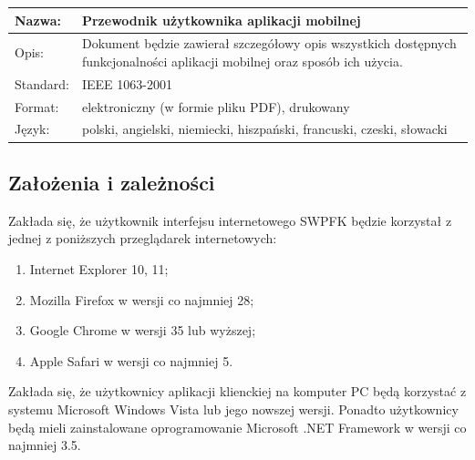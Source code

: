\begin{center}
\begin{tabular}[h]{|p{2cm}|p{13.1cm}|}
\hline
Nazwa: & Przewodnik użytkownika aplikacji mobilnej \\ \hline
Opis: & Dokument będzie zawierał szczegółowy opis wszystkich dostępnych  funkcjonalności aplikacji mobilnej oraz sposób ich użycia.  \\ \hline
Standard: & IEEE 1063-2001 \\ \hline
Format: & elektroniczny (w formie pliku PDF), drukowany \\ \hline
Język: & polski, angielski, niemiecki, hiszpański, francuski, czeski, słowacki \\
\hline
\end{tabular}
\end{center}

\subsection{Założenia i zależności}
Zakłada się, że użytkownik interfejsu internetowego SWPFK będzie korzystał z jednej z poniższych przeglądarek internetowych:
\begin{enumerate}
\item Internet Explorer 10, 11;
\item Mozilla Firefox w wersji co najmniej 28;
\item Google Chrome w wersji 35 lub wyższej;
\item Apple Safari w wersji co najmniej 5.
\end{enumerate}

Zakłada się, że użytkownicy aplikacji klienckiej na komputer PC będą korzystać z systemu Microsoft Windows Vista lub jego nowszej wersji. Ponadto użytkownicy będą mieli zainstalowane oprogramowanie Microsoft .NET Framework w wersji co najmniej 3.5.